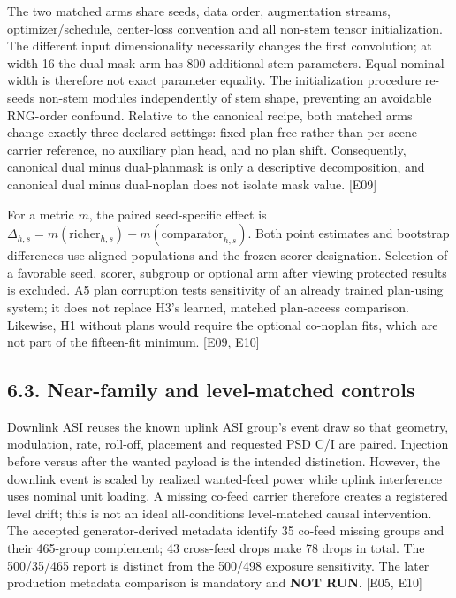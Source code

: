 \documentclass[
  10pt,
]{article}
\begin{document}
The two matched arms share seeds, data order, augmentation streams,
optimizer/schedule, center-loss convention and all non-stem tensor
initialization. The different input dimensionality necessarily changes
the first convolution; at width 16 the dual mask arm has 800 additional
stem parameters. Equal nominal width is therefore not exact parameter
equality. The initialization procedure re-seeds non-stem modules
independently of stem shape, preventing an avoidable RNG-order confound.
Relative to the canonical recipe, both matched arms change exactly three
declared settings: fixed plan-free rather than per-scene carrier
reference, no auxiliary plan head, and no plan shift. Consequently,
canonical dual minus dual-planmask is only a descriptive decomposition,
and canonical dual minus dual-noplan does not isolate mask value.
{[}E09{]}

For a metric \(m\), the paired seed-specific effect is
\(\Delta_{h,s}=m(\text{richer}_{h,s})-m(\text{comparator}_{h,s})\). Both
point estimates and bootstrap differences use aligned populations and
the frozen scorer designation. Selection of a favorable seed, scorer,
subgroup or optional arm after viewing protected results is excluded. A5
plan corruption tests sensitivity of an already trained plan-using
system; it does not replace H3's learned, matched plan-access
comparison. Likewise, H1 without plans would require the optional
co-noplan fits, which are not part of the fifteen-fit minimum. {[}E09,
E10{]}

\subsection{6.3. Near-family and level-matched
controls}\label{near-family-and-level-matched-controls}

Downlink ASI reuses the known uplink ASI group's event draw so that
geometry, modulation, rate, roll-off, placement and requested PSD C/I
are paired. Injection before versus after the wanted payload is the
intended distinction. However, the downlink event is scaled by realized
wanted-feed power while uplink interference uses nominal unit loading. A
missing co-feed carrier therefore creates a registered level drift; this
is not an ideal all-conditions level-matched causal intervention. The
accepted generator-derived metadata identify 35 co-feed missing groups
and their 465-group complement; 43 cross-feed drops make 78 drops in
total. The 500/35/465 report is distinct from the 500/498 exposure
sensitivity. The later production metadata comparison is mandatory and
\textbf{NOT RUN}. {[}E05, E10{]}
\end{document}
